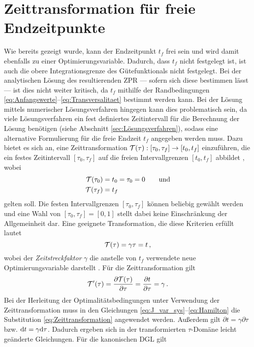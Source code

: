 \section{Zeittransformation für freie Endzeitpunkte}\label{sec:Zeittransformation}
Wie bereits gezeigt wurde, kann der Endzeitpunkt $t_f$ frei sein und wird damit ebenfalls zu einer Optimierungsvariable. Dadurch, dass $t_f$ nicht festgelegt ist, ist auch die obere Integrationsgrenze des Gütefunktionals nicht festgelegt. Bei der analytischen Lösung des resultierenden \gls{ZPR} --- sofern sich diese bestimmen lässt --- ist dies nicht weiter kritisch, da $t_f$ mithilfe der Randbedingungen \eqref{eq:Anfangswerte}--\eqref{eq:Transversalitaet} bestimmt werden kann. Bei der Lösung mittels numerischer Lösungsverfahren hingegen kann dies problematisch sein, da viele Lösungsverfahren ein fest definiertes Zeitintervall für die Berechnung der Lösung benötigen (siehe Abschnitt \ref{sec:Lösungsverfahren}), sodass eine alternative Formulierung für die freie Endzeit $t_f$ angegeben werden muss. Dazu bietet es sich an, eine Zeittransformation $\mathcal{T}(\tau): [\tau_0, \tau_f] \rightarrow [t_0, t_f]$ einzuführen, die ein festes Zeitintervall $[\tau_0, \tau_f]$ auf die freien Intervallgrenzen $[t_0, t_f]$ abbildet \cite{Gerdts.2010}, wobei 
\begin{align}
	\mathcal{T}(\tau_0) &= t_0 = \tau_0 = 0 \qquad \textrm{und} \\
	\mathcal{T}(\tau_f) &= t_f
\end{align}
gelten soll. Die festen Intervallgrenzen $[\tau_0, \tau_f]$ können beliebig gewählt werden und eine Wahl von $[\tau_0, \tau_f] = [0, 1]$ stellt dabei keine Einschränkung der Allgemeinheit dar. Eine geeignete Transformation, die diese Kriterien erfüllt lautet
\begin{equation}
	\mathcal{T}(\tau) = \gamma\tau = t\,, \label{eq:Zeittransformation}
\end{equation}
wobei der \textit{Zeitstreckfaktor} $\gamma$ die anstelle von $t_f$ verwendete neue Optimierungsvariable darstellt \cite{KnutGraichen.2012}. Für die Zeittransformation gilt 
\begin{equation}
	\mathcal{T}'(\tau) = \frac{\partial\mathcal{T}(\tau)}{\partial\tau} = \frac{\partial t}{\partial\tau} = \gamma\,.
\end{equation}
Bei der Herleitung der Optimalitätsbedingungen unter Verwendung der Zeittransformation muss in den Gleichungen \eqref{eq:J_var_sys}--\eqref{eq:Hamilton} die Substitution \eqref{eq:Zeittransformation} angewendet werden. Außerdem gilt $\partial t = \gamma\partial\tau$ bzw. $\textrm{d}{t} = \gamma\textrm{d}{\tau}$. Dadurch ergeben sich in der transformierten $\tau$-Domäne leicht geänderte Gleichungen. Für die kanonischen \gls{DGL} gilt 
